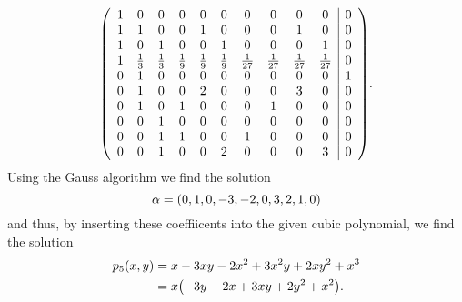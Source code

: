 \documentclass[english]{exercise}
\begin{document}
    \[
        \parentheses*{\begin{array}{cccccccccc|c}
            1 & 0 & 0 & 0 & 0 & 0 & 0 & 0 & 0 & 0 & 0\\
            1 & 1 & 0 & 0 & 1 & 0 & 0 & 0 & 1 & 0 & 0\\
            1 & 0 & 1 & 0 & 0 & 1 & 0 & 0 & 0 & 1 & 0\\
            1 & \frac{1}{3} & \frac{1}{3} & \frac{1}{9} & \frac{1}{9} & \frac{1}{9} & \frac{1}{27} & \frac{1}{27} & \frac{1}{27} & \frac{1}{27} & 0\\
            0 & 1 & 0 & 0 & 0 & 0 & 0 & 0 & 0 & 0 & 1\\
            0 & 1 & 0 & 0 & 2 & 0 & 0 & 0 & 3 & 0 & 0\\
            0 & 1 & 0 & 1 & 0 & 0 & 0 & 1 & 0 & 0 & 0\\
            0 & 0 & 1 & 0 & 0 & 0 & 0 & 0 & 0 & 0 & 0\\
            0 & 0 & 1 & 1 & 0 & 0 & 1 & 0 & 0 & 0 & 0\\
            0 & 0 & 1 & 0 & 0 & 2 & 0 & 0 & 0 & 3 & 0
        \end{array}}.
    \]
    Using the Gauss algorithm we find the solution
    \[
        \alpha = \parentheses*{0, 1, 0, -3, -2, 0, 3, 2, 1, 0}
    \]
    and thus, by inserting these coeffiicents into the given cubic polynomial, we find the solution
    \begin{align*}
        p_5\parentheses*{x, y} &= x - 3xy - 2x^2 + 3x^2 y + 2xy^2 + x^3\\
        &= x\parentheses*{-3y - 2x + 3xy + 2y^2 + x^2}.
    \end{align*}
\end{document}
